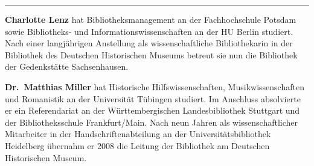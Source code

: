 \begin{center}\rule{0.5\linewidth}{0.5pt}\end{center}

\textbf{Charlotte Lenz} hat
Bibliotheksmanagement an der Fachhochschule Potsdam sowie Bibliotheks-
und Informationswissenschaften an der HU Berlin studiert. Nach einer
langjährigen Anstellung als wissenschaftliche Bibliothekarin in der
Bibliothek des Deutschen Historischen Museums betreut sie nun die
Bibliothek der Gedenkstätte Sachsenhausen.

\textbf{Dr.~Matthias Miller} hat Historische Hilfswissenschaften,
Musikwissenschaften und Romanistik an der Universität Tübingen studiert.
Im Anschluss absolvierte er ein Referendariat an der Württembergischen
Landesbibliothek Stuttgart und der Bibliotheksschule Frankfurt/Main.
Nach neun Jahren als wissenschaftlicher Mitarbeiter in der
Handschriftenabteilung an der Universitätsbibliothek Heidelberg übernahm
er 2008 die Leitung der Bibliothek am Deutschen Historischen Museum.
